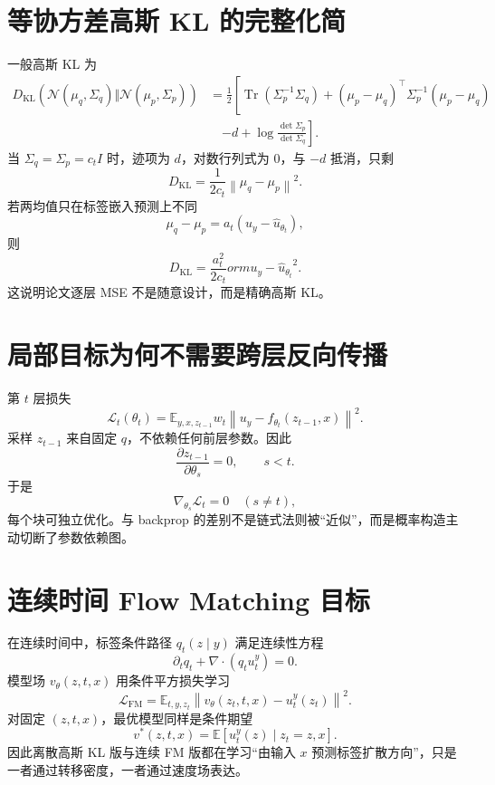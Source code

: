 \documentclass[UTF8,12pt,a4paper,fontset=none]{ctexart}
\numberwithin{equation}{section}
\newcommand{\E}{\mathbb{E}}
\newcommand{\Loss}{\mathcal{L}}
\newcommand{\norm}[1]{\left\lVert #1\right\rVert}
\newcommand{\tr}{\operatorname{Tr}}
\newcommand{\KL}{D_{\mathrm{KL}}}
\begin{document}
\section{等协方差高斯 KL 的完整化简}
一般高斯 KL 为
\begin{align}
 \KL(\mathcal N(\mu_q,\Sigma_q)\Vert
 \mathcal N(\mu_p,\Sigma_p))
 &=\frac12\left[
 \tr(\Sigma_p^{-1}\Sigma_q)
 +(\mu_p-\mu_q)^\top\Sigma_p^{-1}(\mu_p-\mu_q)
 \right.\\
 &\quad\left.-d+\log\frac{\det\Sigma_p}{\det\Sigma_q}
 \right].
\end{align}
当 $\Sigma_q=\Sigma_p=c_tI$ 时，迹项为 $d$，对数行列式为 0，与 $-d$ 抵消，只剩
\begin{equation}
 \KL=\frac1{2c_t}\norm{\mu_q-\mu_p}^2.
\end{equation}
若两均值只在标签嵌入预测上不同
\begin{equation}
 \mu_q-\mu_p=a_t(u_y-\widehat u_{\theta_t}),
\end{equation}
则
\begin{equation}
 \boxed{
 \KL=\frac{a_t^2}{2c_t}
orm{u_y-\widehat u_{\theta_t}}^2.
 }
\end{equation}
这说明论文逐层 MSE 不是随意设计，而是精确高斯 KL。

\section{局部目标为何不需要跨层反向传播}
第 $t$ 层损失
\begin{equation}
 \Loss_t(\theta_t)=
 \E_{y,x,z_{t-1}}
 w_t\norm{u_y-f_{\theta_t}(z_{t-1},x)}^2.
\end{equation}
采样 $z_{t-1}$ 来自固定 $q$，不依赖任何前层参数。因此
\begin{equation}
 \frac{\partial z_{t-1}}{\partial\theta_s}=0,
 \qquad s<t.
\end{equation}
于是
\begin{equation}
 \nabla_{\theta_s}\Loss_t=0\quad(s\ne t),
\end{equation}
每个块可独立优化。与 backprop 的差别不是链式法则被“近似”，而是概率构造主动切断了参数依赖图。

\section{连续时间 Flow Matching 目标}
在连续时间中，标签条件路径 $q_t(z\mid y)$ 满足连续性方程
\begin{equation}
 \partial_tq_t+\nabla\cdot(q_tu_t^y)=0.
\end{equation}
模型场 $v_\theta(z,t,x)$ 用条件平方损失学习
\begin{equation}
 \Loss_{\mathrm{FM}}
 =\E_{t,y,z_t}\norm{v_\theta(z_t,t,x)-u_t^y(z_t)}^2.
\end{equation}
对固定 $(z,t,x)$，最优模型同样是条件期望
\begin{equation}
 v^*(z,t,x)=\E[u_t^y(z)\mid z_t=z,x].
\end{equation}
因此离散高斯 KL 版与连续 FM 版都在学习“由输入 $x$ 预测标签扩散方向”，只是一者通过转移密度，一者通过速度场表达。
\end{document}
